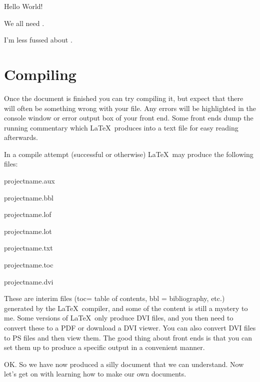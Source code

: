 \vspace{4ex}
Hello World!

We all need .

I'm less fussed about .

\pagebreak
\section{Compiling}
Once the document is finished you can try compiling it, but expect that there will often be something wrong with your file. Any errors will be highlighted in the console window or error output box of your front end. Some front ends dump the running commentary which \LaTeX\ produces into a text file for easy reading afterwards.

In a compile attempt (successful or otherwise) \LaTeX\ may produce the following files:

projectname.aux

projectname.bbl

projectname.lof

projectname.lot

projectname.txt

projectname.toc

projectname.dvi

These are interim files (toc= table of contents, bbl = bibliography, etc.) generated by the \LaTeX\ compiler, and some of the content is still a mystery to me. Some versions of \LaTeX\ only produce DVI files, and you then need to convert these to a PDF or download a DVI viewer. You can also convert DVI files to PS files and then view them. The good thing about front ends is that you can set them up to produce a specific output in a convenient manner.

OK. So we have now produced a silly document that we can understand. Now let's get on with learning how to make our own documents.



